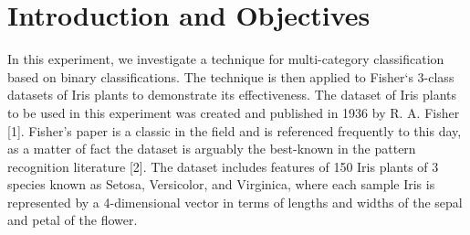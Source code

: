\section{Introduction and Objectives}
\label{sect:introduction}
In this experiment, we investigate a technique for multi-category classification based on binary
classifications. The technique is then applied to Fisher`s 3-class datasets of Iris plants to
demonstrate its effectiveness. The dataset of Iris plants to be used in this experiment was created
and published in 1936 by R. A. Fisher [1]. Fisher's paper is a classic in the field and is referenced
frequently to this day, as a matter of fact the dataset is arguably the best-known in the pattern
recognition literature [2]. The dataset includes features of 150 Iris plants of 3 species known as
Setosa, Versicolor, and Virginica, where each sample Iris is represented by a 4-dimensional vector
in terms of lengths and widths of the sepal and petal of the flower.